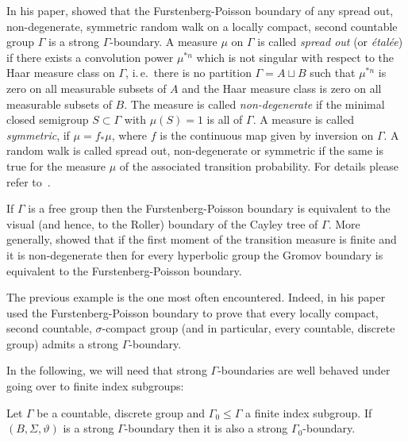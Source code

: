 \begin{bsp}
  \label{bsp:poisson}
  In his paper, \textcite[Theorem 3]{MR2006560} showed that the Furstenberg-Poisson boundary of any spread out, non-degenerate, symmetric random walk on a locally compact, second countable group \(\Gamma\) is a strong \(\Gamma\)-boundary. A measure \(\mu\) on \(\Gamma\) is called \emph{spread out} (or \emph{étalée}) if there exists a convolution power \(\mu^{\ast n}\) which is not singular with respect to the Haar measure class on \(\Gamma\), i.\,e.\ there is no partition \(\Gamma = A \sqcup B\) such that \(\mu^{\ast n}\) is zero on all measurable subsets of \(A\) and the Haar measure class is zero on all measurable subsets of \(B\). The measure is called \emph{non-degenerate} if the minimal closed semigroup \(S \subset \Gamma\) with \(\mu(S) = 1\) is all of \(\Gamma\). A measure is called \emph{symmetric}, if \(\mu = f_\ast \mu\), where \(f\) is the continuous map given by inversion on \(\Gamma\). A random walk is called spread out, non-degenerate or symmetric if the same is true for the measure \(\mu\) of the associated transition probability. For details please refer to~\cite[Section 3]{MR2006560}.

  If \(\Gamma\) is a free group then the Furstenberg-Poisson boundary is equivalent to the visual (and hence, to the Roller) boundary of the Cayley tree of \(\Gamma\). More generally, \textcite{MR1815698} showed that if the first moment of the transition measure is finite and it is non-degenerate then for every hyperbolic group the Gromov boundary is equivalent to the Furstenberg-Poisson boundary.
\end{bsp}

\begin{rem}
  The previous example is the one most often encountered. Indeed, in his paper \textcite{MR2006560} used the Furstenberg-Poisson boundary to prove that every locally compact, second countable, \(\sigma\)-compact group (and in particular, every countable, discrete group) admits a strong \(\Gamma\)-boundary. 
\end{rem}

In the following, we will need that strong \(\Gamma\)-boundaries are well behaved under going over to finite index subgroups:

\begin{thm}
  \label{thm:str-bnd-subgrp}
  Let \(\Gamma\) be a countable, discrete group and \(\Gamma_0 \leq \Gamma\) a finite index subgroup. If \((B, \Sigma, \vartheta)\) is a strong \(\Gamma\)-boundary then it is also a strong \(\Gamma_0\)-boundary.
\end{thm}

